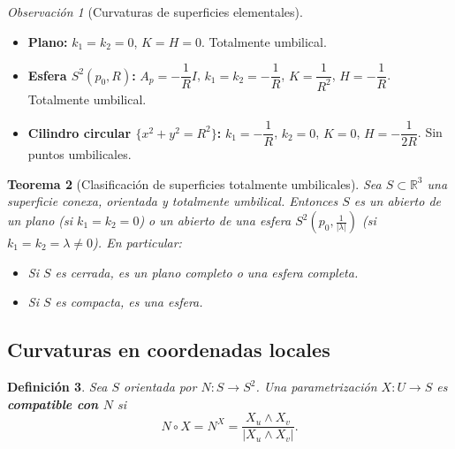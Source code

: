 \documentclass[11pt]{article}
\theoremstyle{plain}
\newtheorem{teorema}{Teorema}[section]
\newtheorem{definicion}[teorema]{Definición}
\theoremstyle{definition}
\theoremstyle{remark}
\newtheorem{observacion}[teorema]{Observación}
\begin{document}
\begin{observacion}[Curvaturas de superficies elementales]\
\begin{itemize}
\item \textbf{Plano:} $k_1=k_2=0$, $K=H=0$. Totalmente umbilical.
\item \textbf{Esfera $S^2(p_0,R)$:} $A_p = -\dfrac{1}{R}I$, $k_1=k_2=-\dfrac{1}{R}$, $K=\dfrac{1}{R^2}$, $H=-\dfrac{1}{R}$. Totalmente umbilical.
\item \textbf{Cilindro circular $\{x^2+y^2=R^2\}$:} $k_1=-\dfrac{1}{R}$, $k_2=0$, $K=0$, $H=-\dfrac{1}{2R}$. Sin puntos umbilicales.
\end{itemize}
\end{observacion}

\begin{teorema}[Clasificación de superficies totalmente umbilicales]
Sea $S\subset\mathbb{R}^3$ una superficie conexa, orientada y totalmente umbilical. Entonces $S$ es un abierto de un plano (si $k_1=k_2=0$) o un abierto de una esfera $S^2\!\left(p_0,\tfrac{1}{|\lambda|}\right)$ (si $k_1=k_2=\lambda\neq 0$). En particular:
\begin{itemize}
\item Si $S$ es cerrada, es un plano completo o una esfera completa.
\item Si $S$ es compacta, es una esfera.
\end{itemize}
\end{teorema}

\subsection{Curvaturas en coordenadas locales}

\begin{definicion}
Sea $S$ orientada por $N:S\to S^2$. Una parametrización $X:U\to S$ es \textbf{compatible con $N$} si
\[
N\circ X = N^X = \frac{X_u\land X_v}{|X_u\land X_v|}.
\]
\end{definicion}
\end{document}
